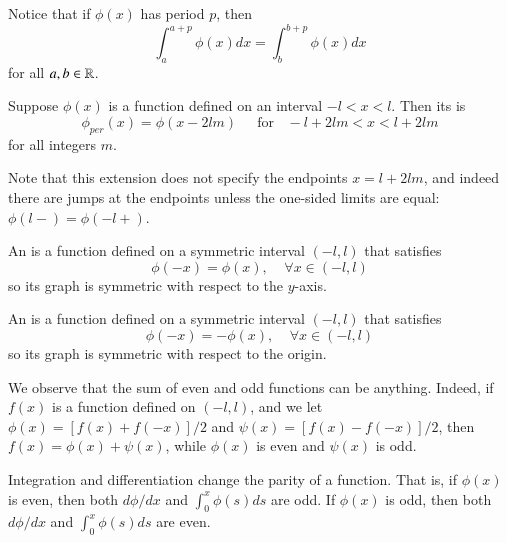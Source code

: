 Notice that if $\phi(x)$ has period $p$, then \begin{equation*}
    \int_a^{a+p}\phi(x)dx = \int_b^{b+p}\phi(x)dx
\end{equation*}
for all $a,b \in \mathbb R$.

\begin{definition}
    Suppose $\phi(x)$ is a function defined on an interval $-l < x < l$. Then its  is \begin{equation*}
        \phi_{per}(x) = \phi(x-2lm)\;\;\;\;\text{ for }\;\;-l + 2lm < x < l+2lm
    \end{equation*}
    for all integers $m$.
\end{definition}

Note that this extension does not specify the endpoints $x = l+2lm$, and indeed there are jumps at the endpoints unless the one-sided limits are equal: $\phi(l-) = \phi(-l+)$.

\begin{definition}
    An  is a function defined on a symmetric interval $(-l,l)$ that satisfies \begin{equation*}
        \phi(-x) = \phi(x),\;\;\;\;\forall x \in (-l,l)
    \end{equation*}
    so its graph is symmetric with respect to the $y$-axis.
\end{definition}



\begin{definition}
    An  is a function defined on a symmetric interval $(-l,l)$ that satisfies \begin{equation*}
        \phi(-x) = -\phi(x),\;\;\;\;\forall x \in (-l,l)
    \end{equation*}
    so its graph is symmetric with respect to the origin.
\end{definition}



We observe that the sum of even and odd functions can be anything. Indeed, if $f(x)$ is a function defined on $(-l,l)$, and we let $\phi(x) = [f(x)+f(-x)]/2$ and $\psi(x) = [f(x)-f(-x)]/2$, then $f(x) = \phi(x)+\psi(x)$, while $\phi(x)$ is even and $\psi(x)$ is odd.

Integration and differentiation change the parity of a function. That is, if $\phi(x)$ is even, then both $d\phi/dx$ and $\int_0^x\phi(s)ds$ are odd. If $\phi(x)$ is odd, then both $d\phi/dx$ and $\int_0^x\phi(s)ds$ are even.

